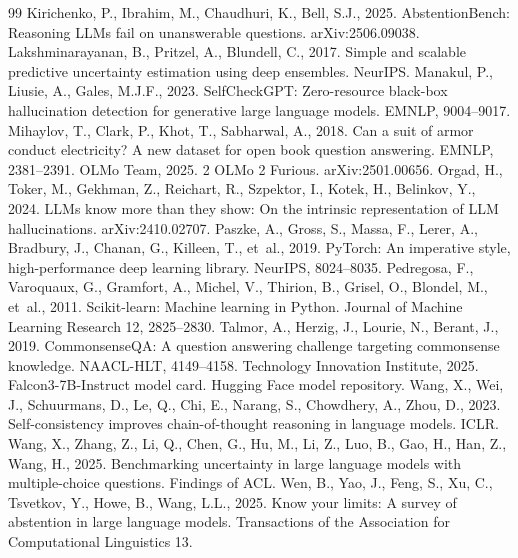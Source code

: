 \documentclass[preprint,12pt,authoryear]{elsarticle}
\begin{document}
\begin{thebibliography}{99}
 Kirichenko, P., Ibrahim, M., Chaudhuri, K., Bell, S.J., 2025. AbstentionBench: Reasoning LLMs fail on unanswerable questions. arXiv:2506.09038.
 Lakshminarayanan, B., Pritzel, A., Blundell, C., 2017. Simple and scalable predictive uncertainty estimation using deep ensembles. NeurIPS.
 Manakul, P., Liusie, A., Gales, M.J.F., 2023. SelfCheckGPT: Zero-resource black-box hallucination detection for generative large language models. EMNLP, 9004--9017.
 Mihaylov, T., Clark, P., Khot, T., Sabharwal, A., 2018. Can a suit of armor conduct electricity? A new dataset for open book question answering. EMNLP, 2381--2391.
 OLMo Team, 2025. 2 OLMo 2 Furious. arXiv:2501.00656.
 Orgad, H., Toker, M., Gekhman, Z., Reichart, R., Szpektor, I., Kotek, H., Belinkov, Y., 2024. LLMs know more than they show: On the intrinsic representation of LLM hallucinations. arXiv:2410.02707.
 Paszke, A., Gross, S., Massa, F., Lerer, A., Bradbury, J., Chanan, G., Killeen, T., et~al., 2019. PyTorch: An imperative style, high-performance deep learning library. NeurIPS, 8024--8035.
 Pedregosa, F., Varoquaux, G., Gramfort, A., Michel, V., Thirion, B., Grisel, O., Blondel, M., et~al., 2011. Scikit-learn: Machine learning in Python. Journal of Machine Learning Research 12, 2825--2830.
 Talmor, A., Herzig, J., Lourie, N., Berant, J., 2019. CommonsenseQA: A question answering challenge targeting commonsense knowledge. NAACL-HLT, 4149--4158.
 Technology Innovation Institute, 2025. Falcon3-7B-Instruct model card. Hugging Face model repository.
 Wang, X., Wei, J., Schuurmans, D., Le, Q., Chi, E., Narang, S., Chowdhery, A., Zhou, D., 2023. Self-consistency improves chain-of-thought reasoning in language models. ICLR.
 Wang, X., Zhang, Z., Li, Q., Chen, G., Hu, M., Li, Z., Luo, B., Gao, H., Han, Z., Wang, H., 2025. Benchmarking uncertainty in large language models with multiple-choice questions. Findings of ACL.
 Wen, B., Yao, J., Feng, S., Xu, C., Tsvetkov, Y., Howe, B., Wang, L.L., 2025. Know your limits: A survey of abstention in large language models. Transactions of the Association for Computational Linguistics 13.

\end{thebibliography}
\end{document}

